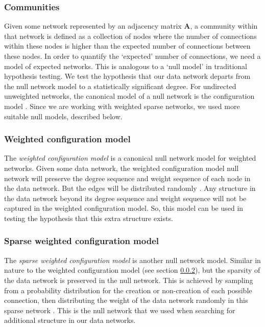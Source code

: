         \subsubsection{Communities}
        Given some network represented by an adjacency matrix $\mathbf{A}$, a community within that network is defined as a collection of nodes where the number of connections within these nodes is higher than the expected number of connections between these nodes. In order to quantify the `expected' number of connections, we need a model of expected networks. This is analogous to a `null model' in traditional hypothesis testing. We test the hypothesis that our data network departs from the null network model to a statistically significant degree. For undirected unweighted networks, the canonical model of a null network is the configuration model  \parencite{fosdick}. Since we are working with weighted sparse networks, we used more suitable null models, described below.

        \subsubsection{Weighted configuration model}\label{sec:weight_configuration_model}
        The \textit{weighted configuration model} is a canonical null network model for weighted networks. Given some data network, the weighted configuration model null network will preserve the degree sequence and weight sequence of each node in the data network. But the edges will be distributed randomly  \parencite{fosdick}. Any structure in the data network beyond its degree sequence and weight sequence will not be captured in the weighted configuration model. So, this model can be used in testing the hypothesis that this extra structure exists.

        \subsubsection{Sparse weighted configuration model}\label{sec:sparse_weighted_configuration_model}
        The \textit{sparse weighted configuration model} is another null network model. Similar in nature to the weighted configuration model (see section \ref{sec:weight_configuration_model}), but the sparsity of the data network is preserved in the null network. This is achieved by sampling from a probability distribution for the creation or non-creation of each possible connection, then distributing the weight of the data network randomly in this sparse network  \parencite{humphries}. This is the null network that we used when searching for additional structure in our data networks.

